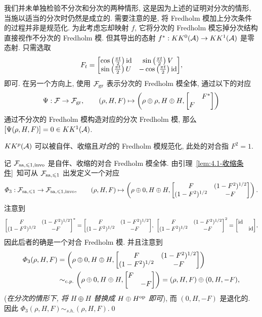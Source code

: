 我们并未单独检验不分次和分次的两种情形, 这是因为上述的证明对分次的情形, 当施以适当的分次时仍然是成立的. 需要注意的是, 将 Fredholm 模加上分次条件的过程并非是规范化. 为此考虑忘却映射 $ f $, 它将分次的 Fredholm 模忘掉分次结构直接视作不分次的 Fredholm 模. 但其导出的态射 $ f^* : KK^0(\mathcal{A})\to KK^1(\mathcal{A}) $ 是零态射. 只需选取
\[
		F_t=\mqty[\cos\left(\frac{\pi t}{2}\right)\id & \sin\left(\frac{\pi t}{2}\right)V \\ \sin\left(\frac{\pi t}{2}\right)U & -\cos\left(\frac{\pi t}{2}\right)\id],
\]
即可. 在另一个方向上, 使用 $ \mathcal{F}_{\text{gr}} $ 表示分次的 Fredholm 模全体, 通过以下的对应
\[
	\Psi : \CF\to\CF_{\text{gr}},\qquad (\rho, H, F)\mapsto\left(\rho\oplus\rho, H\oplus H, \mqty[ & F^* \\ F &]\right)
\]
通过不分次的 Fredholm 模构造对应的分次 Fredholm 模, 那么 $ [\Psi(\rho, H, F)]=0\in KK^1(\mathcal{A}) $.

\begin{Lemma}\label{lem:4.1-对合条件}
	$ KK^p(\mathcal{A}) $ 可以被自伴、收缩且\textit{对合}的 Fredholm 模规范化, 此处的对合指 $ F^2=1 $.
\end{Lemma}
\begin{Proof}
	记 $ \mathcal{F}_{\text{sa},\leqslant 1,\text{invo}} $ 是自伴、收缩的对合 Fredholm 模全体. 由引理~\ref{lem:4.1-收缩条件}~知可从 $ \mathcal{F}_{\text{sa},\leqslant 1} $ 出发定义一个对应
	\[
		\varPhi_3 : \CF_{\text{sa},\leqslant 1}\to\CF_{\text{sa},\leqslant 1,\text{invo}},\qquad (\rho, H, F)\mapsto\left(\rho\oplus 0, H\oplus H, \mqty[F & (1-F^2)^{1/2} \\ (1-F^2)^{1/2} & -F]\right).
	\]
	注意到
	\[
		\mqty[F & (1-F^2)^{1/2} \\ (1-F^2)^{1/2} & -F]^*=\mqty[F & (1-F^2)^{1/2} \\ (1-F^2)^{1/2} & -F],\ \mqty[F & (1-F^2)^{1/2} \\ (1-F^2)^{1/2} & -F]^2=\mqty[\id & \\ & \id],
	\]
	因此后者的确是一个对合 Fredholm 模. 并且注意到
	\[
		\begin{aligned}
			\varPhi_3(\rho, H, F)&=\left(\rho\oplus 0, H\oplus H, \mqty[F & (1-F^2)^{1/2} \\ (1-F^2)^{1/2} & -F]\right)\\
			&\sim_{c.p.}\left(\rho\oplus 0, H\oplus H, \mqty[F & \\ & -F]\right)=(\rho, H, F)\oplus(0, H, -F),
		\end{aligned}
	\]
	(\textit{在分次的情形下, 将 $ H\oplus H $ 替换成 $ H\oplus H^{\text{op}} $ 即可}), 而 $ (0, H, -F) $ 是退化的. 因此 $ \varPhi_3(\rho, H, F)\sim_{s.h.}(\rho, H, F) $.\qed
\end{Proof}

